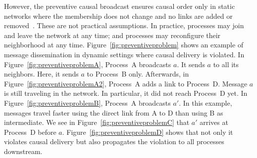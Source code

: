 

\begin{figure*}
  \begin{center}
    \hspace{20pt}
    \hspace{20pt}
    \hspace{20pt}
    \hspace{20pt}
    \caption{\label{fig:preventiveproblem}Preventive causal broadcast may
      violate causal order in dynamic settings.}
  \end{center}
\end{figure*}


However, the preventive causal broadcast ensures causal order only in static
networks where the membership does not change and no links are added or
removed~\cite{friedman2004causal}. These are not practical assumptions.  In
practice, processes may join and leave the network at any time; and processes
may reconfigure their neighborhood at any time.
Figure~\ref{fig:preventiveproblem} shows an example of message dissemination in
dynamic settings where causal delivery is violated. In
Figure~\ref{fig:preventiveproblemA}, Process~A broadcasts $a$. It sends $a$ to
all its neighbors. Here, it sends $a$ to Process~B only.  Afterwards, in
Figure~\ref{fig:preventiveproblemA2}, Process~A adds a link to
Process~D. Message $a$ is still traveling in the network. In particular, it did
not reach Process~D yet. In Figure~\ref{fig:preventiveproblemB}, Process~A
broadcasts $a'$. In this example, messages travel faster using the direct link
from A to D than using B as intermediate.  We see in
Figure~\ref{fig:preventiveproblemC} that $a'$ arrives at Process~D before
$a$. Figure~\ref{fig:preventiveproblemD} shows that not only it violates causal
delivery but also propagates the violation to all processes downstream.

